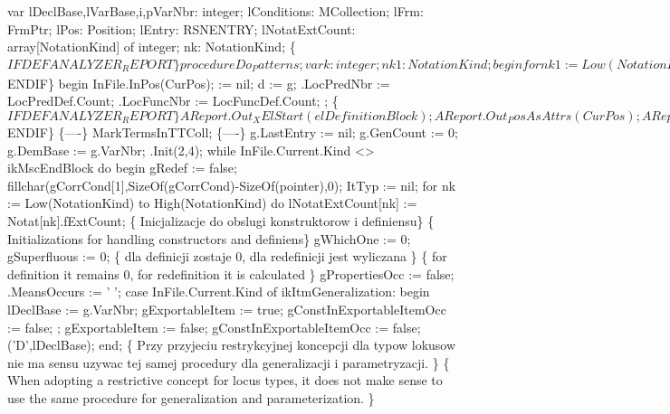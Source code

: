 var
   lDeclBase,lVarBase,i,pVarNbr: integer;
   lConditions: MCollection;
   lFrm: FrmPtr;
   lPos: Position;
   lEntry: RSNENTRY;
   lNotatExtCount: array[NotationKind] of integer;
   nk: NotationKind;
   \{$IFDEF ANALYZER_REPORT\}
   procedure Do_Patterns;
   var
      k: integer;
      nk1: NotationKind;
   begin
      for nk1 := Low(NotationKind) to High(NotationKind) do
         with Notat[nk1] do
            for k := Count + lNotatExtCount[nk1] to Count + fExtCount - 1 do
               AReport.Out_Pattern(Items^[k], k+1);
   end;
   \{$ENDIF\}
begin
   InFile.InPos(CurPos);
    := nil;
   d := g;
   .LocPredNbr := LocPredDef.Count;
   .LocFuncNbr := LocFuncDef.Count;
   ;
   \{$IFDEF ANALYZER_REPORT\}
   AReport.Out_XElStart(elDefinitionBlock);
   AReport.Out_PosAsAttrs(CurPos);
   AReport.Out_XAttrEnd;
   \{$ENDIF\}
   \{----\}
   MarkTermsInTTColl;
   \{----\}
   g.LastEntry := nil; g.GenCount := 0; g.DemBase := g.VarNbr;
   .Init(2,4);
   while InFile.Current.Kind <> ikMscEndBlock do
   begin gRedef := false;
   fillchar(gCorrCond[1],SizeOf(gCorrCond)-SizeOf(pointer),0);
   ItTyp := nil;
   for nk := Low(NotationKind) to High(NotationKind) do
      lNotatExtCount[nk] := Notat[nk].fExtCount;
   \{ Inicjalizacje do obslugi konstruktorow i definiensu\}
   \{ Initializations for handling constructors and definiens\}
   gWhichOne := 0;
   gSuperfluous := 0; \{ dla definicji zostaje 0, dla redefinicji jest wyliczana \}
                      \{ for definition it remains 0, for redefinition it is calculated \}
   gPropertiesOcc := false;
   .MeansOccurs := ' ';
   case InFile.Current.Kind of
      ikItmGeneralization:
         begin
            lDeclBase := g.VarNbr;
            gExportableItem := true;
            gConstInExportableItemOcc := false;
            ;
            gExportableItem := false;
            gConstInExportableItemOcc := false;
            ('D',lDeclBase);
         end;
      \{ Przy przyjeciu restrykcyjnej koncepcji dla typow lokusow nie ma sensu
        uzywac tej samej procedury dla generalizacji i parametryzacji.
      \}
      \{ When adopting a restrictive concept for locus types, it does not make sense
        to use the same procedure for generalization and parameterization. \}
